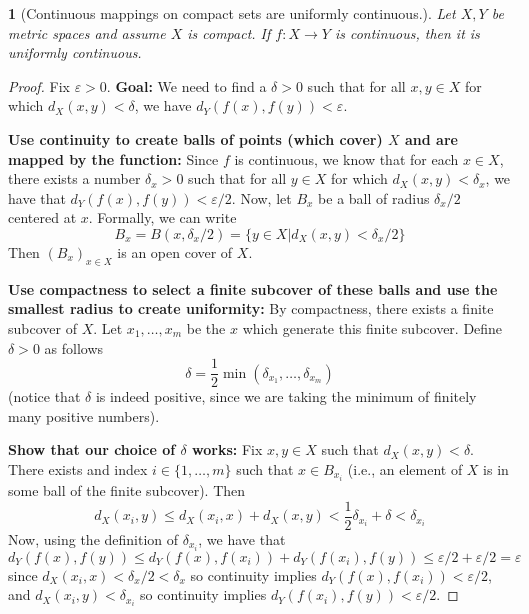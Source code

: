 \documentclass[11pt]{article}
\numberwithin{equation}{section}
\theoremstyle{plain}
\newtheorem{theorem}{\color{ForestGreen}{\textbf{Theorem}}}[section]
\theoremstyle{definition}
\newcommand{\1}{\mathbbm 1}
\def\d{\delta}
\newcommand{\e}{\varepsilon}
\begin{document}
\begin{theorem}[Continuous mappings on compact sets are uniformly continuous.]
	Let $X,Y$ be metric spaces and assume $X$ is compact. If $f: X \to Y$ is continuous, then it is uniformly continuous. 
\end{theorem}
\begin{proof}
	Fix $\e > 0$. \textbf{Goal:} We need to find a $\d > 0$ such that for all $x,y \in X$ for which $d_X(x,y) < \d$, we have $d_Y(f(x),f(y)) < \e$. 

	\textbf{Use continuity to create balls of points (which cover) $X$ and are mapped by the function:} Since $f$ is continuous, we know that for each $x \in X$, there exists a number $\d_x > 0$ such that for all $y \in X$ for which $d_X(x,y) < \d_x$, we have that $d_Y(f(x),f(y)) < \e/2$. Now, let $B_x$ be a ball of radius $\d_x/2$ centered at $x$. Formally, we can write
	\begin{equation*}
		B_x = B(x, \d_x / 2) = \{y \in X | d_X(x,y) < \d_x /2 \} 
	\end{equation*}
	Then $(B_x)_{x\in X}$ is an open cover of $X$. 

	\textbf{Use compactness to select a finite subcover of these balls and use the smallest radius to create uniformity:} By compactness, there exists a finite subcover of $X$. Let $x_1, \ldots, x_m$ be the $x$ which generate this finite subcover. Define $\d > 0$ as follows
	\begin{equation}
		\d = \frac{1}{2} \min (\d_{x_1}, \ldots, \d_{x_m})
	\end{equation}
	(notice that $\d$ is indeed positive, since we are taking the minimum of finitely many positive numbers).

	\textbf{Show that our choice of $\d$ works:} Fix $x,y \in X$ such that $d_X(x,y) < \d$. There exists and index $i \in \{1, \ldots, m\}$ such that $x \in B_{x_i}$ (i.e., an element of $X$ is in some ball of the finite subcover). Then
	\begin{equation}
		d_X(x_i,y) \leq d_X(x_i, x) + d_X(x,y) < \frac{1}{2} \d_{x_i} + \d < \d_{x_i} 
	\end{equation} 
	Now, using the definition of $\d_{x_i}$, we have that
	\begin{equation}
		d_Y(f(x),f(y)) \leq d_Y(f(x),f(x_i)) + d_Y(f(x_i),f(y)) \leq \e/2 + \e/2 = \e
	\end{equation}
	since $d_X(x_i, x) < \d_x / 2 < \delta_x$ so continuity implies $d_Y(f(x),f(x_i)) < \e / 2$, and  $d_X(x_i,y) < \d_{x_i}$ so continuity implies  $d_Y(f(x_i),f(y)) < \e /2$.
\end{proof}
\end{document}
